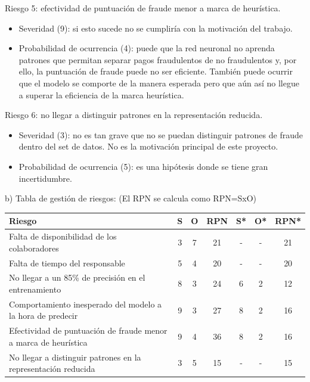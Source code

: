\documentclass[
11pt, %
]{charter}
\begin{document}
Riesgo 5: efectividad de puntuación de fraude menor a marca de heurística.
\begin{itemize}
	\item Severidad (9): si esto sucede no se cumpliría con la motivación del trabajo.
	\item Probabilidad de ocurrencia (4): puede que la red neuronal no aprenda patrones que permitan separar pagos fraudulentos de no fraudulentos y, por ello, la puntuación de fraude puede no ser eficiente. También puede ocurrir que el modelo se comporte de la manera esperada pero que aún así no llegue a superar la eficiencia de la marca heurística. 
\end{itemize}

Riesgo 6: no llegar a distinguir patrones en la representación reducida.
\begin{itemize}
	\item Severidad (3): no es tan grave que no se puedan distinguir patrones de fraude dentro del set de datos. No es la motivación principal de este proyecto.
	\item Probabilidad de ocurrencia (5): es una hipótesis donde se tiene gran incertidumbre.
\end{itemize}

b) Tabla de gestión de riesgos:      (El RPN se calcula como RPN=SxO)

\begin{table}[htpb]
\centering
\begin{tabularx}{\linewidth}{@{}|X|c|c|c|c|c|c|@{}}
\hline
\rowcolor[HTML]{C0C0C0} 
Riesgo & S & O & RPN & S* & O* & RPN* \\ \hline
		Falta de disponibilidad de los colaboradores & 3  & 7  & 21 & - & - &  21 \\ \hline
       Falta de tiempo del responsable & 5  & 4  & 20 & - & - & 20 \\ \hline
       No llegar a un 85\% de precisión en el entrenamiento & 8  & 3  & 24 & 6 & 2 & 12     \\ \hline
       Comportamiento inesperado del modelo a la hora de predecir & 9  & 3  & 27 &  8  &  2  &  16    \\ \hline
       Efectividad de puntuación de fraude menor a marca de heurística & 9 & 4 & 36 & 8 & 2 & 16     \\ \hline
      No llegar a distinguir patrones en la representación reducida & 3 &  5 & 15 & -  & -   & 15  \\ \hline
\end{tabularx}
\end{table}
\end{document}

